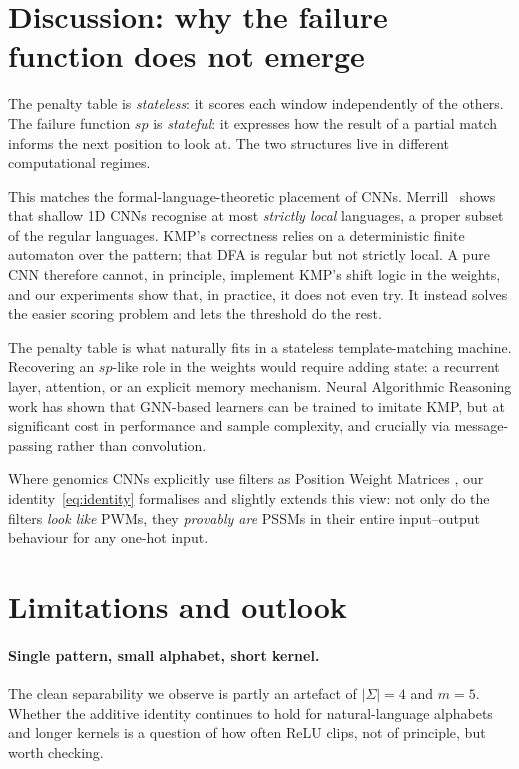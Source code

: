 \documentclass[11pt,a4paper]{article}
\newcommand{\sigmaalph}{\Sigma}
\begin{document}
\section{Discussion: why the failure function does not emerge}
\label{sec:discussion}

The penalty table is \emph{stateless}: it scores each window independently
of the others. The failure function $sp$ is \emph{stateful}: it expresses
how the result of a partial match informs the next position to look at.
The two structures live in different computational regimes.

This matches the formal-language-theoretic placement of CNNs.
Merrill~\cite{Merrill2019} shows that shallow 1D CNNs recognise at most
\emph{strictly local} languages, a proper subset of the regular
languages. KMP's correctness relies on a deterministic finite automaton
over the pattern; that DFA is regular but not strictly local. A pure
CNN therefore cannot, in principle, implement KMP's shift logic in the
weights, and our experiments show that, in practice, it does not even
try. It instead solves the easier scoring problem and lets the
threshold do the rest.

The penalty table is what naturally fits in a stateless template-matching
machine. Recovering an $sp$-like role in the weights would require
adding state: a recurrent layer, attention, or an explicit memory
mechanism. Neural Algorithmic Reasoning work \cite{CLRS2022} has shown
that GNN-based learners can be trained to imitate KMP, but at
significant cost in performance and sample complexity, and crucially via
message-passing rather than convolution.

Where genomics CNNs explicitly use filters as Position Weight Matrices
\cite{DeepBind2015,KooEddy2019}, our identity~\eqref{eq:identity}
formalises and slightly extends this view: not only do the filters
\emph{look like} PWMs, they \emph{provably are} PSSMs in their entire
input--output behaviour for any one-hot input.

\section{Limitations and outlook}
\label{sec:limitations}

\paragraph{Single pattern, small alphabet, short kernel.}
The clean separability we observe is partly an artefact of
$|\sigmaalph| = 4$ and $m = 5$. Whether the additive identity
continues to hold for natural-language alphabets and longer kernels is
a question of how often ReLU clips, not of principle, but worth
checking.
\end{document}
